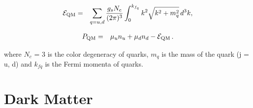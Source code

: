 \begin{eqnarray}
	{\cal E}_{\rm QM}&=& \sum_{q=u,d}\frac{g_s N_c}{(2\pi)^3}\int_0^{k_{f_{q}}}k^2\sqrt{k^2 + m_{q}^2 }\, d^3k,
\end{eqnarray}

\begin{eqnarray}
	P_{\rm QM} &=& \mu_{u} n_{u} + \mu_{d} n_{d} - {\cal E}_{\rm QM} \, .
\end{eqnarray} 

where $N_{c}$ = 3 is the color degeneracy of quarks, $m_q$ is the mass of the quark (j = u, d) and $k_{fq}$ is the Fermi momenta of quarks.




\section{Dark Matter}

